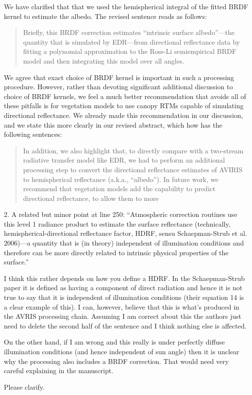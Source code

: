\documentclass{article}
\newenvironment{reviewer}{\par\color{Mahogany}\vspace{6pt}}{\par\vspace{6pt}}
\begin{document}
We have clarified that that we used the hemispherical integral of the fitted BRDF kernel to estimate the albedo.
The revised sentence reads as follows:

\begin{quote}
  Briefly, this BRDF correction estimates ``intrinsic surface albedo''---the quantity that is simulated by EDR---from directional reflectance data by fitting a polynomial approximation to the Ross-Li semiempirical BRDF model and then integrating this model over all angles.
\end{quote}

We agree that exact choice of BRDF kernel is important in such a processing procedure.
However, rather than devoting significant additional discussion to choice of BRDF kernels, we feel a much better recommendation that avoids all of these pitfalls is for vegetation models to use canopy RTMs capable of simulating directional reflectance.
We already made this recommendation in our discussion, and we state this more clearly in our revised abstract, which how has the following sentences:

\begin{quote}
  In addition, we also highlight that, to directly compare with a two-stream radiative transfer model like EDR, we had to perform an additional processing step to convert the directional reflectance estimates of AVIRIS to hemispherical reflectance (a.k.a., ``albedo'').
  In future work, we recommend that vegetation models add the capability to predict directional reflectance, to allow them to more
\end{quote}

\begin{reviewer}
  2. A related but minor point at line 250: ``Atmospheric correction routines use this level 1 radiance product to estimate the surface reflectance (technically, hemispherical-directional reflectance factor, HDRF, sensu Schaepman-Strub et al. 2006)—a quantity that is (in theory) independent of illumination conditions and therefore can be more directly related to intrinsic physical properties of the surface.''

  I think this rather depends on how you define a HDRF. In the Schaepman-Strub paper it is defined as having a component of direct radiation and hence it is not true to say that it is independent of illumination conditions (their equation 14 is a clear example of this). I can, however, believe that this is what's produced in the AVRIS processing chain. Assuming I am correct about this the authors just need to delete the second half of the sentence and I think nothing else is affected.

  On the other hand, if I am wrong and this really is under perfectly diffuse illumination conditions (and hence independent of sun angle) then it is unclear why the processing also includes a BRDF correction. That would need very careful explaining in the manuscript.

  Please clarify.
\end{reviewer}
\end{document}
